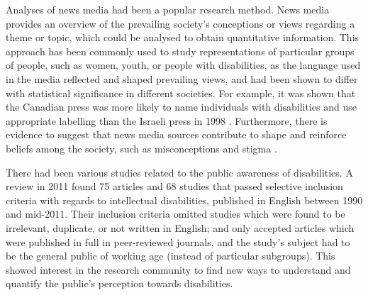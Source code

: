 \documentclass{report}
\begin{document}
Analyses of news media had been a popular research method.
News media provides an overview of the prevailing society's conceptions or views regarding a theme or topic, which could be analysed to obtain quantitative information.
This approach has been commonly used to study representations of particular groups of people, such as women, youth, or people with disabilities, as the language used in the media reflected and shaped prevailing views, and had been shown to differ with statistical significance in different societies.
For example, it was shown that the Canadian press was more likely to name individuals with disabilities and use appropriate labelling than the Israeli press in 1998 \cite{gold1999media}.
Furthermore, there is evidence to suggest that news media sources contribute to shape and reinforce beliefs among the society, such as misconceptions and stigma \cite{wahl1992mass}.

There had been various studies related to the public awareness of disabilities.
A review in 2011 \cite{scior2011public} found 75 articles and 68 studies that passed selective inclusion criteria with regards to intellectual disabilities, published in English between 1990 and mid-2011. 
Their inclusion criteria omitted studies which were found to be irrelevant, duplicate, or not written in English; and only accepted articles which were published in full in peer-reviewed journals, and the study's subject had to be the general public of working age (instead of particular subgroups).
This showed interest in the research community to find new ways to understand and quantify the public's perception towards disabilities.
\end{document}
